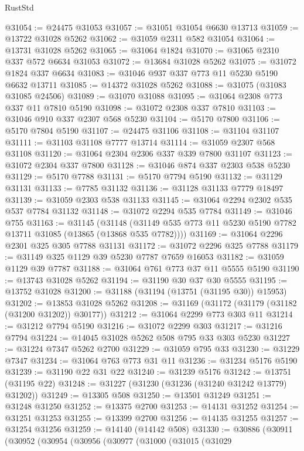 \begin{lexlean}{RustStd}
\begin{coremodule}
@31054 := @24475 @31053
@31057 := @31051 @31054 @6630 @13713
@31059 := @13722 @31028 @5262
@31062 := @31059 @2311 @582 @31054
@31064 := @13731 @31028 @5262
@31065 := @31064 @1824
@31070 := @31065 @2310 @337 @572 @6634 @31053
@31072 := @13684 @31028 @5262
@31075 := @31072 @1824 @337 @6634
@31083 := @31046 @937 @337 @773 @11 @5230 @5190 @6632 @13711
@31085 := @14372 @31028 @5262
@31088 := @31075 (@31083 @31085 @24506)
@31089 := @31070 @31088
@31095 := @31064 @2308 @773 @337 @11 @7810 @5190
@31098 := @31072 @2308 @337 @7810
@31103 := @31046 @910 @337 @2307 @568 @5230
@31104 := @5170 @7800
@31106 := @5170 @7804 @5190
@31107 := @24475 @31106
@31108 := @31104 @31107
@31111 := @31103 @31108 @7777 @13714
@31114 := @31059 @2307 @568 @31108
@31120 := @31064 @2304 @2306 @337 @339 @7800 @31107
@31123 := @31072 @2304 @337 @7800
@31128 := @31046 @874 @337 @2303 @538 @5230
@31129 := @5170 @7788
@31131 := @5170 @7794 @5190
@31132 := @31129 @31131
@31133 := @7785 @31132
@31136 := @31128 @31133 @7779 @18497
@31139 := @31059 @2303 @538 @31133
@31145 := @31064 @2294 @2302 @535 @537 @7784 @31132
@31148 := @31072 @2294 @535 @7784
@31149 := @31046 @755
@31163 := @31145
    (@31148 (@31149 @535 @773 @11 @5230 @5190 @7782 @13711 @31085 (@13865 (@13868 @535 @7782))))
@31169 := @31064 @2296 @2301 @325 @305 @7788 @31131
@31172 := @31072 @2296 @325 @7788
@31179 := @31149 @325 @1129 @39 @5230 @7787 @7659 @16053
@31182 := @31059 @1129 @39 @7787
@31188 := @31064 @761 @773 @37 @11 @5555 @5190
@31190 := @13743 @31028 @5262
@31194 := @31190 @30 @37 @30 @5555
@31195 := @13752 @31028
@31200 := @31188 (@31194 (@13751 (@31195 @30)) @15953)
@31202 := @13853 @31028 @5262
@31208 := @31169 (@31172 (@31179 (@31182 (@31200 @31202)) @30177))
@31212 := @31064 @2299 @773 @303 @11
@31214 := @31212 @7794 @5190
@31216 := @31072 @2299 @303
@31217 := @31216 @7794
@31224 := @14045 @31028 @5262 @508 @795 @33 @303 @5230
@31227 := @31224 @7347 @5262 @2700
@31229 := @31059 @795 @33
@31230 := @31229 @7347
@31234 := @31064 @763 @773 @31 @11
@31236 := @31234 @5176 @5190
@31239 := @31190 @22 @31 @22
@31240 := @31239 @5176
@31242 := @13751 (@31195 @22)
@31248 := @31227 (@31230 (@31236 (@31240 @31242 @13779) @31202))
@31249 := @13305 @508
@31250 := @13501 @31249
@31251 := @31248 @31250
@31252 := @13375 @2700
@31253 := @14131 @31252
@31254 := @31251 @31253
@31255 := @13399 @2700
@31256 := @14135 @31255
@31257 := @31254 @31256
@31259 := @14140 (@14142 @508)
@31330 := @30886
    (@30911
      (@30952
        (@30954
          (@30956
            (@30977
              (@31000
                (@31015
                  (@31029

\end{coremodule}
\end{lexlean}

